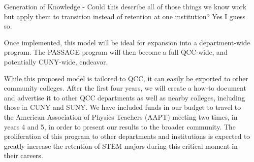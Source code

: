 \documentclass[12pt]{article}
\begin{document}
Generation of Knowledge - Could this describe all of those things we know work but apply them to transition instead of retention at one institution?  Yes I guess so.

Once implemented, this model will be ideal for expansion into a department-wide program.  
The PASSAGE program will then become a full QCC-wide, and potentially CUNY-wide, endeavor.

While this proposed model is tailored to QCC, it can easily be exported to other community colleges.  After the first four years, we will create a how-to document and advertise it to other QCC departments as well as nearby colleges, including those in CUNY and SUNY.  We have included funds in our budget to travel to the American Association of Physics Teachers (AAPT) meeting two times, in years 4 and 5, in order to present our results to the broader community.  The proliferation of this program to other departments and institutions is expected to greatly increase the retention of STEM majors during this critical moment in their careers.



%
%
%
%
%
%
\end{document}
